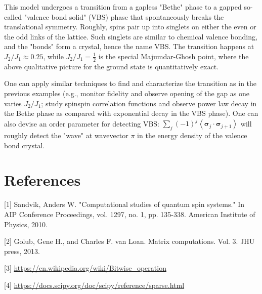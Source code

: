 \documentclass[12pt]{article}
\begin{document}
This model undergoes a transition from a gapless "Bethe" phase to a gapped so-called "valence bond solid" (VBS) phase that spontaneously breaks the translational symmetry. Roughly, spins pair up into singlets on either the even or the odd links of the lattice. Such singlets are similar to chemical valence bonding, and the "bonds" form a crystal, hence the name VBS. The transition happens at $J_{2} / J_{1} \approx 0.25$, while $J_{2} / J_{1}=\frac{1}{2}$ is the special Majumdar-Ghosh point, where the above qualitative picture for the ground state is quantitatively exact.

One can apply similar techniques to find and characterize the transition as in the previous examples (e.g., monitor fidelity and observe opening of the gap as one varies $J_{2} / J_{1}$; study spinspin correlation functions and observe power law decay in the Bethe phase as compared with exponential decay in the VBS phase). One can also devise an order parameter for detecting VBS: $\sum_{j}(-1)^{j}\left\langle\boldsymbol{\sigma}_{j} \cdot \boldsymbol{\sigma}_{j+1}\right\rangle$ will roughly detect the "wave" at wavevector $\pi$ in the energy density of the valence bond crystal.

\section*{References}
[1] Sandvik, Anders W. "Computational studies of quantum spin systems." In AIP Conference Proceedings, vol. 1297, no. 1, pp. 135-338. American Institute of Physics, 2010.

[2] Golub, Gene H., and Charles F. van Loan. Matrix computations. Vol. 3. JHU press, 2013.

[3] \href{https://en.wikipedia.org/wiki/Bitwise_operation}{https://en.wikipedia.org/wiki/Bitwise\_operation}

[4] \href{https://docs.scipy.org/doc/scipy/reference/sparse.html}{https://docs.scipy.org/doc/scipy/reference/sparse.html}
\end{document}
